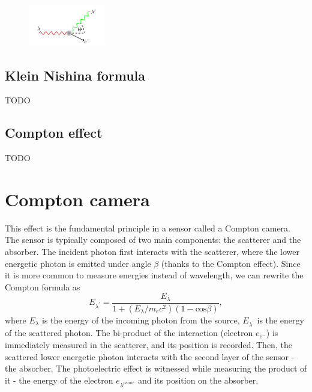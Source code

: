 {  \begin{figure}[!h]
      \centering
      \includegraphics[width=0.3\textwidth]{./fig/photos/scattering.png}
  \end{figure}


  \subsection{Klein Nishina formula}
  TODO

  \subsection{Compton effect}
  TODO


  \section{Compton camera}
  This effect is the fundamental principle in a sensor called a Compton camera. 
  The sensor is typically composed of two main components: the scatterer and the absorber. 
  The incident photon first interacts with the scatterer, where the lower energetic photon is emitted under angle $\beta$ (thanks to the Compton effect). 
  Since it is more common to measure energies instead of wavelength, we can rewrite the Compton formula as
  \begin{equation}
  E_{\lambda^{\prime}} = \frac{E_{\lambda}}{  1 + (E_{\lambda} / m_{e}c^{2}) (1 - \mathrm{cos} \beta)},
  \end{equation}
  where $E_{\lambda}$ is the energy of the incoming photon from the source, $E_{\lambda^{\prime}}$ is the energy of the scattered photon.  
  The bi-product of the interaction (electron $e_{e^{-}}$) is immediately measured in the scatterer, and its position is recorded.
  Then, the scattered lower energetic photon interacts with the second layer of the sensor - the absorber. 
  The photoelectric effect is witnessed while measuring the product of it - the energy of the electron $e_{\lambda^{prime}}$ and its position on the absorber.

}
